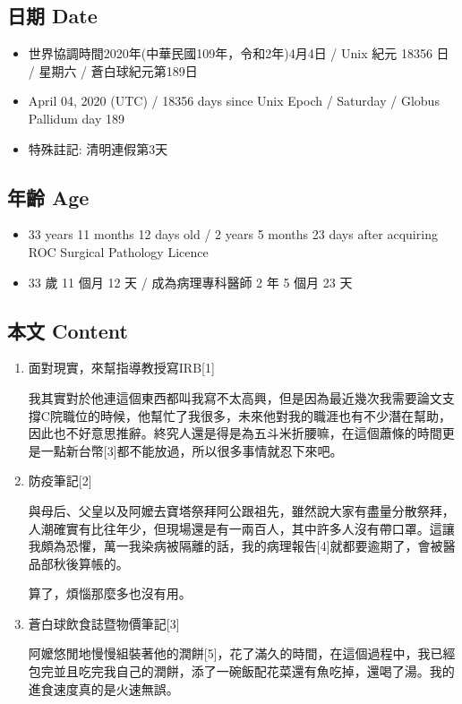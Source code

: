 \documentclass[
]{article}
\providecommand{\tightlist}{%
  \setlength{\itemsep}{0pt}\setlength{\parskip}{0pt}}
\begin{document}
\hypertarget{ux65e5ux671f-date-3}{%
\subsection{日期 Date}\label{ux65e5ux671f-date-3}}

\begin{itemize}
\tightlist
\item
  世界協調時間2020年(中華民國109年，令和2年)4月4日 / Unix 紀元 18356 日
  / 星期六 / 蒼白球紀元第189日
\item
  April 04, 2020 (UTC) / 18356 days since Unix Epoch / Saturday / Globus
  Pallidum day 189
\item
  特殊註記: 清明連假第3天
\end{itemize}

\hypertarget{ux5e74ux9f61-age-3}{%
\subsection{年齡 Age}\label{ux5e74ux9f61-age-3}}

\begin{itemize}
\tightlist
\item
  33 years 11 months 12 days old / 2 years 5 months 23 days after
  acquiring ROC Surgical Pathology Licence
\item
  33 歲 11 個月 12 天 / 成為病理專科醫師 2 年 5 個月 23 天
\end{itemize}

\hypertarget{ux672cux6587-content-3}{%
\subsection{本文 Content}\label{ux672cux6587-content-3}}

\begin{enumerate}
\def\labelenumi{\arabic{enumi}.}
\item
  面對現實，來幫指導教授寫IRB{[}1{]}

  我其實對於他連這個東西都叫我寫不太高興，但是因為最近幾次我需要論文支撐C院職位的時候，他幫忙了我很多，未來他對我的職涯也有不少潛在幫助，因此也不好意思推辭。終究人還是得是為五斗米折腰嘛，在這個蕭條的時間更是一點新台幣{[}3{]}都不能放過，所以很多事情就忍下來吧。
\item
  防疫筆記{[}2{]}

  與母后、父皇以及阿嬤去寶塔祭拜阿公跟祖先，雖然說大家有盡量分散祭拜，人潮確實有比往年少，但現場還是有一兩百人，其中許多人沒有帶口罩。這讓我頗為恐懼，萬一我染病被隔離的話，我的病理報告{[}4{]}就都要逾期了，會被醫品部秋後算帳的。

  算了，煩惱那麼多也沒有用。
\item
  蒼白球飲食誌暨物價筆記{[}3{]}

  阿嬤悠閒地慢慢組裝著他的潤餅{[}5{]}，花了滿久的時間，在這個過程中，我已經包完並且吃完我自己的潤餅，添了一碗飯配花菜還有魚吃掉，還喝了湯。我的進食速度真的是火速無誤。
\end{enumerate}
\end{document}
